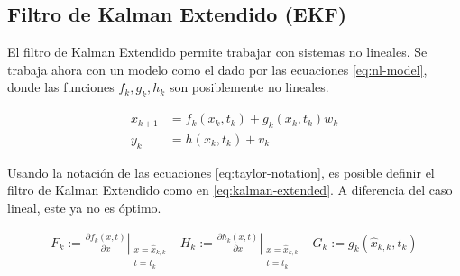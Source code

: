 



\subsection{Filtro de Kalman Extendido (EKF)}\label{filtro-extendido}


El filtro de Kalman Extendido permite trabajar con sistemas no lineales. Se trabaja ahora con un modelo como el dado por las ecuaciones \ref{eq:nl-model}, donde las funciones \(f_k, g_k, h_k\) son posiblemente no lineales. 

\begin{equation}\label{eq:nl-model}
\begin{aligned}
x_{k+1} &= f_k(x_k, t_k) + g_k(x_k, t_k) w_k \\
y_{k} &= h(x_k, t_k) + v_k
\end{aligned}
\end{equation}

Usando la notación de las ecuaciones \ref{eq:taylor-notation}, es posible definir el filtro de Kalman Extendido como en \ref{eq:kalman-extended}. A diferencia del caso lineal, este ya no es óptimo.

\begin{equation}\label{eq:taylor-notation}
\begin{aligned}
F_k := \left. \frac{\partial f_k(x, t)}{\partial x} \right|_{\substack{x = \hat{x}_{k,k} \\ t = t_k }} & H_k := \left. \frac{\partial h_k(x, t)}{\partial x} \right|_{\substack{x = \hat{x}_{k,k} \\ t = t_k }} & G_k := g_k(\hat{x}_{k,k}, t_k)
\end{aligned}
\end{equation}



